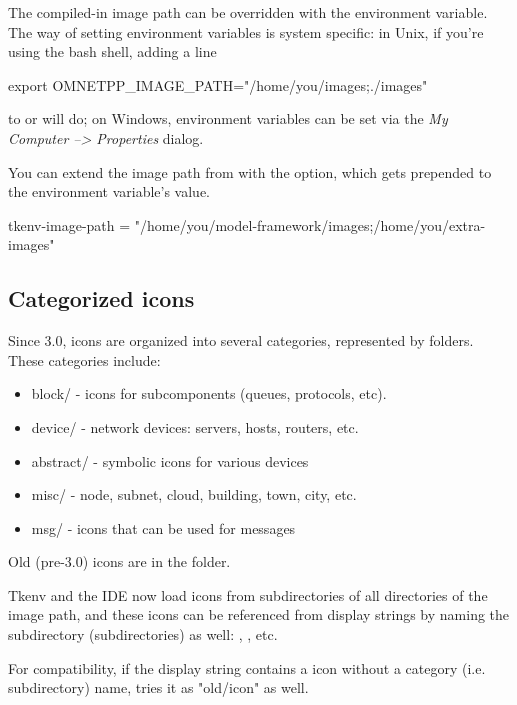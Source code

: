 The compiled-in image path can be overridden with the 
environment variable. The way of setting environment variables is system
specific: in Unix, if you're using the bash shell, adding a line

\begin{commandline}
export OMNETPP_IMAGE_PATH="/home/you/images;./images"
\end{commandline}

to  or  will do; on Windows, environment variables
can be set via the \textit{My Computer --> Properties} dialog.

You can extend the image path from  with the
 option, which gets prepended to the environment
variable's value.

\begin{inifile}
[General]
tkenv-image-path = "/home/you/model-framework/images;/home/you/extra-images"
\end{inifile}


\subsection{Categorized icons}

Since {\opp} 3.0, icons are organized into several categories, represented
by folders. These categories include:

\begin{itemize}
  \item block/ - icons for subcomponents (queues, protocols, etc).
  \item device/ - network devices: servers, hosts, routers, etc.
  \item abstract/ - symbolic icons for various devices
  \item misc/ - node, subnet, cloud, building, town, city, etc.
  \item msg/ - icons that can be used for messages
\end{itemize}

Old (pre-3.0) icons are in the  folder.

Tkenv and the IDE now load icons from subdirectories of all directories
of the image path, and these icons can be referenced from display strings
by naming the subdirectory (subdirectories) as well:
, , etc.

For compatibility, if the display string contains a icon without
a category (i.e. subdirectory) name, {\opp} tries it as "old/icon" as well.

